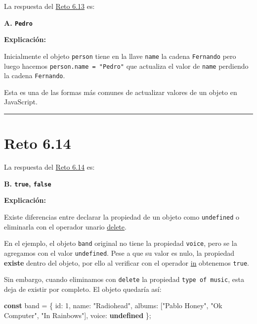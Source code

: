 \documentclass[
  letterpaper,
  DIV=11,
  numbers=noendperiod]{scrreprt}
\newenvironment{Shaded}{\begin{snugshade}}{\end{snugshade}}
\newcommand{\DataTypeTok}[1]{\textcolor[rgb]{0.68,0.00,0.00}{#1}}
\newcommand{\DecValTok}[1]{\textcolor[rgb]{0.68,0.00,0.00}{#1}}
\newcommand{\KeywordTok}[1]{\textcolor[rgb]{0.00,0.23,0.31}{\textbf{#1}}}
\newcommand{\NormalTok}[1]{\textcolor[rgb]{0.00,0.23,0.31}{#1}}
\newcommand{\OperatorTok}[1]{\textcolor[rgb]{0.37,0.37,0.37}{#1}}
\newcommand{\StringTok}[1]{\textcolor[rgb]{0.13,0.47,0.30}{#1}}
\begin{document}
La respuesta del \hyperref[sec-cap6-reto13]{Reto 6.13} es:

\textbf{A. \texttt{Pedro}}

\textbf{Explicación:}

Inicialmente el objeto \texttt{person} tiene en la llave \texttt{name}
la cadena \texttt{Fernando} pero luego hacemos
\texttt{person.name\ =\ "Pedro"} que actualiza el valor de \texttt{name}
perdiendo la cadena \texttt{Fernando}.

Esta es una de las formas más comunes de actualizar valores de un objeto
en JavaScript.

\begin{center}\rule{0.5\linewidth}{0.5pt}\end{center}

\section{Reto 6.14}\label{sec-sol-cap6-reto14}

La respuesta del \hyperref[sec-cap6-reto14]{Reto 6.14} es:

\textbf{B. \texttt{true}, \texttt{false}}

\textbf{Explicación:}

Existe diferencias entre declarar la propiedad de un objeto como
\texttt{undefined} o eliminarla con el operador unario
\hyperref[glos-delete]{delete}.

En el ejemplo, el objeto \texttt{band} original no tiene la propiedad
\texttt{voice}, pero se la agregamos con el valor \texttt{undefined}.
Pese a que su valor es nulo, la propiedad \textbf{existe} dentro del
objeto, por ello al verificar con el operador \hyperref[glos-in]{in}
obtenemos \texttt{true}.

Sin embargo, cuando eliminamos con \texttt{delete} la propiedad
\texttt{type\ of\ music}, esta deja de existir por completo. El objeto
quedaría así:

\begin{Shaded}
\begin{Highlighting}[]
\KeywordTok{const}\NormalTok{ band }\OperatorTok{=}\NormalTok{ \{}
  \DataTypeTok{id}\OperatorTok{:} \DecValTok{1}\OperatorTok{,}
  \DataTypeTok{name}\OperatorTok{:} \StringTok{"Radiohead"}\OperatorTok{,}
  \DataTypeTok{albums}\OperatorTok{:}\NormalTok{ [}\StringTok{"Pablo Honey"}\OperatorTok{,} \StringTok{"Ok Computer"}\OperatorTok{,} \StringTok{"In Rainbows"}\NormalTok{]}\OperatorTok{,}
  \DataTypeTok{voice}\OperatorTok{:} \KeywordTok{undefined}
\NormalTok{\}}\OperatorTok{;}
\end{Highlighting}
\end{Shaded}
\end{document}
